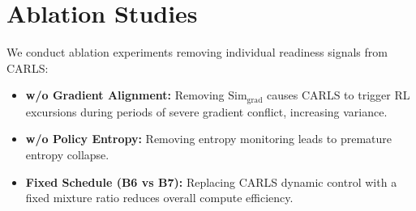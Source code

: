 \section{Ablation Studies}
\label{sec:ablations}

We conduct ablation experiments removing individual readiness signals from CARLS:
\begin{itemize}
    \item \textbf{w/o Gradient Alignment:} Removing $\text{Sim}_{\text{grad}}$ causes CARLS to trigger RL excursions during periods of severe gradient conflict, increasing variance.
    \item \textbf{w/o Policy Entropy:} Removing entropy monitoring leads to premature entropy collapse.
    \item \textbf{Fixed Schedule (B6 vs B7):} Replacing CARLS dynamic control with a fixed mixture ratio reduces overall compute efficiency.
\end{itemize}
